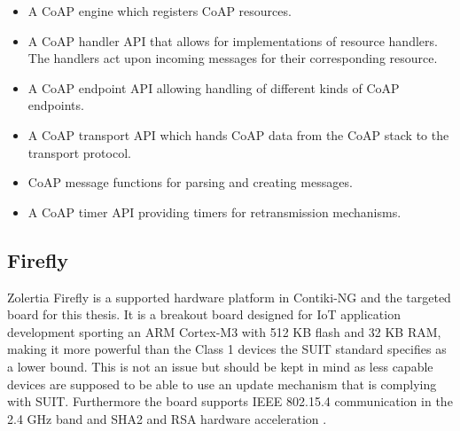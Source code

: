 \documentclass[0-thesis.tex]{subfiles}
\begin{document}
\begin{itemize}
    \item A CoAP engine which registers CoAP resources.
    \item A CoAP handler API that allows for implementations of resource handlers. The
        handlers act upon incoming messages for their corresponding resource.
    \item A CoAP endpoint API allowing handling of different kinds of CoAP endpoints.
    \item A CoAP transport API which hands CoAP data from the CoAP stack to the transport
    protocol.
    \item CoAP message functions for parsing and creating messages.
    \item A CoAP timer API providing timers for retransmission mechanisms.    
\end{itemize}

\subsection{Firefly}
\label{ssec:firefly}
Zolertia Firefly is a supported hardware platform in Contiki-NG and the targeted board for
this thesis. It is a breakout board designed for IoT application development sporting an
ARM Cortex-M3 with 512 KB flash and 32 KB RAM, making it more powerful than the Class 1
devices the SUIT standard specifies as a lower bound. This is not an issue but should be
kept in mind as less capable devices are supposed to be able to use an update mechanism
that is complying with SUIT. Furthermore the board supports IEEE 802.15.4 communication in
the 2.4 GHz band and SHA2 and RSA hardware acceleration \parencite{firefly-datasheet}.
\end{document}
